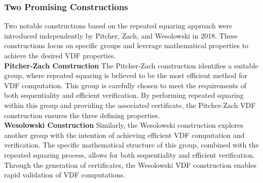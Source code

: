 \subsubsection{Two Promising Constructions}
Two notable constructions based on the repeated squaring approach were introduced independently by Pitcher, Zach, and Wesolowski in 2018. These constructions focus on specific groups and leverage mathematical properties to achieve the desired VDF properties.\\

\noindent
\textbf{Pitcher-Zach Construction}
The Pitcher-Zach construction identifies a suitable group, where repeated squaring is believed to be the most efficient method for VDF computation. This group is carefully chosen to meet the requirements of both sequentiality and efficient verification. By performing repeated squaring within this group and providing the associated certificate, the Pitcher-Zach VDF construction ensures the three defining properties.\\

\noindent
\textbf{Wesolowski Construction}
Similarly, the Wesolowski construction explores another group with the intention of achieving efficient VDF computation and verification. The specific mathematical structure of this group, combined with the repeated squaring process, allows for both sequentiality and efficient verification. Through the generation of certificates, the Wesolowski VDF construction enables rapid validation of VDF computations.

